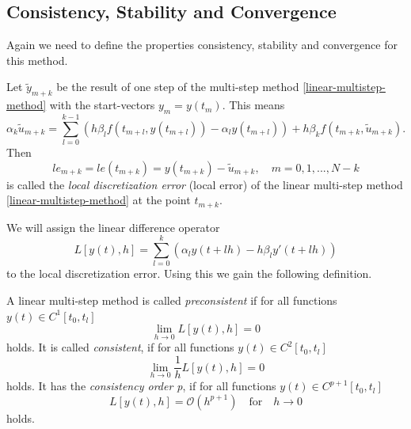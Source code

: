 		
	
	\subsection{Consistency, Stability and Convergence}
	\cite{NumerikGewöhnlicherDifferentialgleichungen}
	
	Again we need to define the properties consistency, stability and convergence for this method.
	\begin{definition}
		Let $\tilde{y}_{m+k}$ be the result of one step of the multi-step method \ref{linear-multistep-method} with the start-vectors $y_m = y(t_m)$. This means
		\begin{displaymath}
			\alpha_k \tilde{u}_{m+k} = \sum_{l=0}^{k-1} \left( h \beta_l f(t_{m+l}, y(t_{m+l})) - \alpha_l y(t_{m+l}) \right) + h \beta_k f(t_{m+k}, \tilde{u}_{m+k}) .
		\end{displaymath}
		Then
		\begin{displaymath}
			le_{m+k} = le(t_{m+k}) = y(t_{m+k}) - \tilde{u}_{m+k}, \quad m=0,1,...,N-k
		\end{displaymath}
		is called the \emph{local discretization error} (local error) of the linear multi-step method \ref{linear-multistep-method} at the point $t_{m+k}$.
	\end{definition}
	
	We will assign the linear difference operator
	\begin{equation}
		L[y(t),h] = \sum_{l=0}^{k} \left( \alpha_l y(t+lh) - h \beta_l y'(t+lh) \right)
	\end{equation}
	to the local discretization error. Using this we gain the following definition.

	\begin{definition}
		A linear multi-step method is called \emph{preconsistent} if for all functions $y(t) \in C^1[t_0,t_l]$
		\begin{displaymath}
			\lim\limits_{h \to 0} L[y(t),h]=0
		\end{displaymath}
		holds. It is called \emph{consistent}, if for all functions $y(t) \in C^2[t_0,t_l]$
		\begin{displaymath}
			\lim\limits_{h \to 0} \frac{1}{h} L[y(t),h] = 0
		\end{displaymath}
		holds. It has the \emph{consistency order p}, if for all functions $y(t) \in C^{p+1}[t_0, t_l]$
		\begin{displaymath}
			L[y(t),h] = \mathcal{O}(h^{p+1}) \quad \text{for} \quad h \to 0
		\end{displaymath}
		holds.
	\end{definition}

